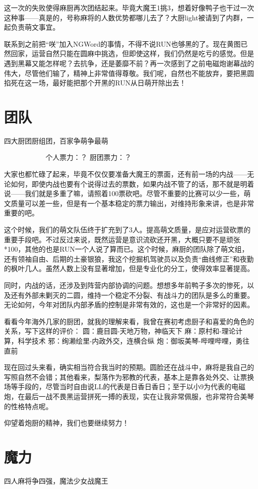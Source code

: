 这一次的失败使得麻厨再次团结起来。毕竟大魔王1挑3，想着好像鸭子也干过一次这种事——真是的，号称麻将的人数优势都哪儿去了？大厨light被请到了内群，一起负责萌文事宜。

联系到之前把“咲”加入NGWord的事情，不得不说RUN也够黑的了。现在黄图已然回家，运营自然只能在圆麻中挑选，但即使这样，我们仍然是吃亏的感觉。但是遇到黑幕又能怎样呢？去抗争，还是萎靡不前？再一次感到了之前电磁炮谢幕战的伟大，尽管他们输了，精神上非常值得尊敬。我们呢，自然也不能放弃，要把黑圆掐死在这一场，最好能把那个开黑的RUN从日萌开除出去！


\section{团队}
四大厨团厨组团，百家争萌争最萌

　　　　　　个人票力：？ 厨团票力：？

大家也都忙碌了起来，毕竟不仅仅要准备大魔王的票面，还有前一场的内战——无论如何，即使内战也要有个说得过去的票数，如果内战不管了的话，那不就是明着说——我们就是多重了嘛，请照着100票砍吧。尽管不重要的比赛可以少一些，萌文质量可以差一些，但是有一个基本稳定的票力输出，对维持形象来讲，也是非常重要的吧。

这个时候，我们的萌文队伍终于扩充到了3人。提高萌文质量，是应对运营砍票的重要手段吧。不过反过来说，既然运营是意识流砍还开黑，大概只要不是顽张*100，其他的也是RUN一个人说了算而已。这个时候，麻厨的团队除了萌文组，还有领袖自由、后期的土豪银狼，我这个挖掘机驾驶员以及负责“曲线修正”和夜勤的枫叶几人。虽然人数上没有显著增加，但是专业化的分工，使得效率显著提高。

同时，内战的话，还涉及到阵营内部协调的问题。想想多年前鸭子多次的惨死，以及还有外部未剿灭的二圆，维持一个稳定不分裂、有战斗力的团队是多么的重要。无论如何，今年对团队内部矛盾的控制是非常有效的，这也是一个非常好的因素。

看看今年海外几家的厨团，就我的理解来看，我曾在赛初考虑厨子和喜爱的角色的关系，写下这样的评价：
圆：鹿目圆-天地万物，神临天下
麻：原村和-理论计算，科学技术
邪：绚濑绘里-内政外交，连横合纵
炮：御坂美琴-哔哩哔哩，勇往直前

现在回过头来看，确实相当符合我当时的预期。圆脸还在战斗中，麻将是我自己的写照自然不会错；其他看来，梨落作为邪教的代表，基本上是靠各处外交、让票换场等手段的，尽管当时自由说LL的代表是日香日香日；至于以小9为代表的电磁炮，在最后一战不畏黑运营拼死一搏的表现，实在让我非常佩服，也非常符合美琴的性格特点呢。

仰望着炮厨的精神，我们也要继续努力！


\section{魔力}
四人麻将争四强，魔法少女战魔王

